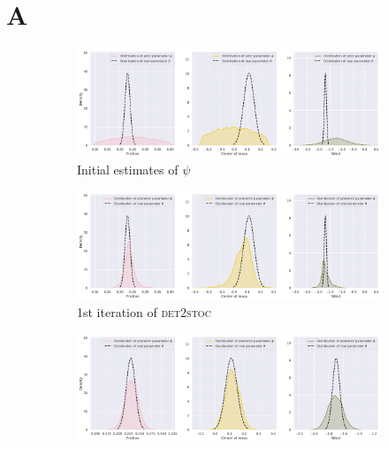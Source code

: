 \documentclass{kththesis}
\newcommand{\dettostoc}{\textsc{det2stoc}}
\begin{document}
\appendix

\chapter{A}
\label{appendix:a}


\begin{figure}
\centering
{}
\captionsetup{size=footnotesize}
\begin{subfigure}{\linewidth}
  \includegraphics[width=1.0\linewidth]{img/windyslope/latent-representation/new/iter0}
  \caption{Initial estimates of $\psi$}
  \label{fig_3_parameters_0}
\end{subfigure}
\begin{subfigure}{\linewidth}
  \includegraphics[width=1.0\linewidth]{img/windyslope/latent-representation/new/latent_encoding_iter1}
  \caption{1st iteration of \dettostoc{}}
  \label{fig_3_parameters_0}
\end{subfigure}
\begin{subfigure}{\textwidth}
  \includegraphics[width=1.0\linewidth]{img/windyslope/latent-representation/new/latent_encoding_iter2}

\end{subfigure}
\end{figure}
\end{document}
